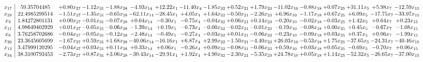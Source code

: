 \documentclass[9pt]{article}
\begin{document}
 \[\begin{array}{c| c c@{\hskip 2pt} c@{\hskip 2pt} c@{\hskip 2pt} c@{\hskip 2pt} c@{\hskip 2pt} c@{\hskip 2pt} c@{\hskip 2pt} c@{\hskip 2pt} c@{\hskip 2pt} c@{\hskip 2pt} c@{\hskip 2pt} c@{\hskip 2pt} c@{\hskip 2pt} c@{\hskip 2pt} c@{\hskip 2pt} }
 x_{17}   &  59.35704485 & +  0.80 x_{27} & -1.12 x_{31} & -1.88 x_{28} & -4.93 x_{14} & + 12.22 x_{1} & -11.40 x_{4} & -1.85 x_{32} & +  0.52 x_{21} & +  1.79 x_{23} & -11.02 x_{10} & -0.88 x_{18} & +  0.07 x_{25} & + 31.11 x_{5} & +  5.98 x_{7} & -12.59 x_{15}\\
 x_{29}   &  22.4985299514 & -1.51 x_{27} & -1.35 x_{31} & -0.65 x_{28} & -62.11 x_{14} & -28.45 x_{1} & +  4.05 x_{4} & +  1.64 x_{32} & -0.50 x_{21} & -2.26 x_{23} & +  6.96 x_{10} & -1.17 x_{18} & +  0.67 x_{25} & +  6.09 x_{5} & -17.75 x_{7} & -33.97 x_{15}\\
 x_{3}   &  1.84272801131 & +  0.00 x_{27} & -0.01 x_{31} & -0.07 x_{28} & +  0.64 x_{14} & -0.30 x_{1} & -0.75 x_{4} & -0.04 x_{32} & +  0.06 x_{21} & +  0.14 x_{23} & -0.20 x_{10} & -0.02 x_{18} & -0.03 x_{25} & +  1.42 x_{5} & +  0.64 x_{7} & +  0.23 x_{15}\\
 x_{11}   &  4.98649402929 & +  0.01 x_{27} & -0.05 x_{31} & -0.06 x_{28} & -1.39 x_{14} & +  0.19 x_{1} & -0.73 x_{4} & -0.00 x_{32} & -0.02 x_{21} & -0.01 x_{23} & -0.19 x_{10} & -0.08 x_{18} & +  0.00 x_{25} & +  0.45 x_{5} & -0.67 x_{7} & -1.08 x_{15}\\
 x_{8}   &  3.76258702686 & -0.04 x_{27} & -0.05 x_{31} & -0.12 x_{28} & -2.48 x_{14} & -0.49 x_{1} & -0.27 x_{4} & -0.03 x_{32} & +  0.01 x_{21} & -0.06 x_{23} & -0.23 x_{10} & -0.09 x_{18} & +  0.03 x_{25} & +  0.37 x_{5} & +  0.06 x_{7} & -1.99 x_{15}\\
 x_{20}   &  23.3645605699 & -1.67 x_{27} & +  0.59 x_{31} & +  1.68 x_{28} & -40.06 x_{14} & -16.16 x_{1} & +  6.87 x_{4} & +  2.99 x_{32} & -1.50 x_{21} & -4.40 x_{23} & + 26.03 x_{10} & -0.53 x_{18} & +  1.75 x_{25} & -37.65 x_{5} & -24.31 x_{7} & -40.46 x_{15}\\
 x_{12}   &  3.47999120295 & -0.04 x_{27} & +  0.03 x_{31} & +  0.11 x_{28} & +  0.33 x_{14} & +  0.06 x_{1} & -0.26 x_{4} & +  0.09 x_{32} & -0.08 x_{21} & -0.06 x_{23} & +  0.59 x_{10} & +  0.03 x_{18} & +  0.05 x_{25} & -0.69 x_{5} & -0.70 x_{7} & +  0.06 x_{15}\\
 x_{34}   &  38.3100793453 & -2.73 x_{27} & +  0.87 x_{31} & +  3.06 x_{28} & -30.43 x_{14} & -29.91 x_{1} & +  1.92 x_{4} & +  4.90 x_{32} & -2.30 x_{21} & -5.35 x_{23} & + 24.78 x_{10} & +  0.05 x_{18} & +  1.14 x_{25} & -52.32 x_{5} & -26.65 x_{7} & -37.00 x_{15}\\

\end{array}\]
\end{document}
